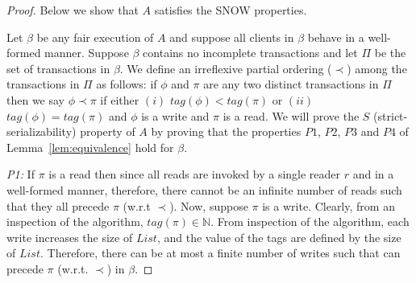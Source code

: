 	\begin{proof} Below we show that $A$ satisfies the  SNOW properties. 
	
	Let $\beta$ be any fair execution  of  $A$ and 
 suppose all clients in $\beta$ behave in a well-formed
manner. Suppose $\beta$ contains no incomplete transactions and let  $\Pi$ be the set of transactions in $\beta$.  We define an irreflexive partial ordering ($\prec$) among the transactions in $\Pi$ as follows:  if $\phi$ and $\pi$ are any two distinct transactions in $\Pi$ then we say 
	$\phi \prec \pi$ if either $(i)$ $tag(\phi) < tag(\pi)$ or $(ii)$ $tag(\phi) = tag(\pi)$ and $\phi$ is a {\sc write} and $\pi$ is a {\sc read}. We will prove the $S$  (strict-serializability) property of $A$ by proving that the properties $P1$, $P2$, $P3$ and $P4$ of Lemma~\ref{lem:equivalence} hold for $\beta$. 
	
	\emph{P1:}   If $\pi$ is a {\sc read} then since all {\sc read}s are invoked by a single reader $r$ and in a well-formed manner, 
	therefore, there cannot be an infinite number of {\sc read}s such that they all 
	precede $\pi$ (w.r.t $\prec$).
	 Now, suppose $\pi$ is a {\sc write}. Clearly, from an inspection of the algorithm, 
	 $tag(\pi) \in \mathbb{N}$. From inspection of the algorithm, each {\sc write} increases the size of 
	 $List$, and the value of the tags are  defined by the size of $List$. Therefore, there can be at 
	 most a finite number of {\sc write}s such that can precede $\pi$ (w.r.t. $\prec$) in $\beta$.
	  

\end{proof}
